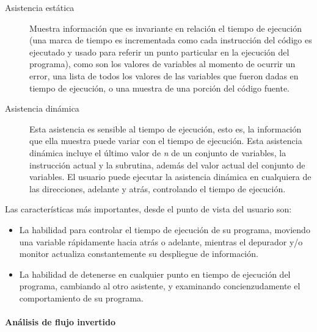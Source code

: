 \documentclass[12pt,legalpaper]{report}
\begin{document}
\begin{description}
	\item[Asistencia estática] Muestra información que es invariante en relación el tiempo de ejecución (una marca de tiempo es incrementada como cada instrucción del código es ejecutado y usado para referir un punto particular en la ejecución del programa), como son los valores de variables al momento de ocurrir un error, una lista de todos los valores de las variables que fueron dadas en tiempo de ejecución, o una muestra de una porción del código fuente.

	\item[Asistencia dinámica] Esta asistencia es sensible al tiempo de ejecución, esto es, la información que ella muestra puede variar con el tiempo de ejecución.  Esta asistencia dinámica incluye el último valor de \textit{n} de un conjunto de variables, la instrucción actual y la subrutina, además del valor actual del conjunto de variables.  El usuario puede ejecutar la asistencia dinámica en cualquiera de las direcciones, adelante y atrás, controlando el tiempo de ejecución.

\end{description}

Las características más importantes, desde el punto de vista del usuario son:

\begin{itemize}
	\item La habilidad para controlar el tiempo de ejecución de su programa, moviendo una variable rápidamente hacia atrás o adelante, mientras el depurador y/o monitor actualiza constantemente su despliegue de información.

	\item La habilidad de detenerse en cualquier punto en tiempo de ejecución del programa, cambiando al otro asistente, y examinando concienzudamente el comportamiento de su programa.

\end{itemize}

			\paragraph[Análisis de flujo]{Análisis de flujo invertido}
\end{document}
